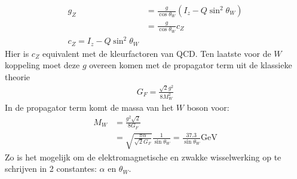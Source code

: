 \documentclass[../main.tex]{subfiles}
\begin{document}
\begin{equation}
    \begin{aligned}
        \label{eq:koppeling_z}
        g_Z &= \frac{g}{\cos\theta_W} (I_z - Q\sin^2\theta_W)\\
            &= \frac{g}{\cos\theta_W} c_Z\\
            c_Z = I_z - Q\sin^2\theta_W
    \end{aligned}
\end{equation}
Hier is $c_Z$ equivalent met de kleurfactoren van QCD. Ten laatste voor de $W$ koppeling moet deze $g$ overeen komen met de propagator term uit de klassieke theorie
\begin{equation}
    \begin{aligned}
        \label{eq:koppeling_w}
        G_F = \frac{\sqrt{2}g^2}{8M_W^2} 
    \end{aligned}
\end{equation}
In de propagator term komt de massa van het $W$ boson voor:
\begin{equation}
    \begin{aligned}
        \label{eq:massa_w}
        M_W &= \frac{g^2\sqrt{2}}{8G_F} \\
            &= \sqrt{ \frac{\pi\alpha}{\sqrt{2}G_F}} \frac{1}{\sin\theta_W} = \frac{37.3}{\sin\theta_W} \text{GeV}
    \end{aligned}
\end{equation}
Zo is het mogelijk om de elektromagnetische en zwakke wisselwerking op te schrijven in 2 constantes: $\alpha$ en $\theta_W$.
\end{document}
